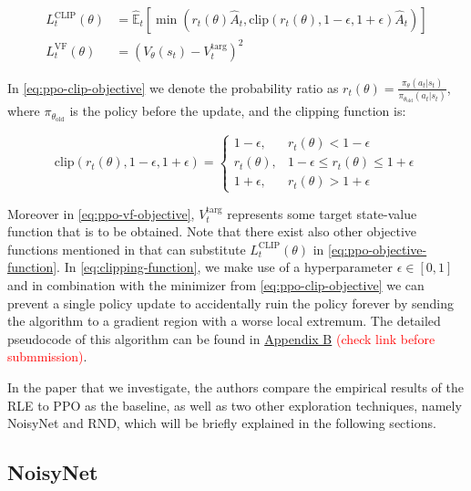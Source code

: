 \documentclass[10pt]{article} %
\begin{document}
\begin{align}
  \label{eq:ppo-clip-objective} L_{t}^{\text{CLIP}}(\theta) &= \hat{\mathbb{E}}_{t}\left[\min\left(r_{t}(\theta) \hat{A}_{t}, \text{clip}\left(r_{t}(\theta), 1 - \epsilon, 1 + \epsilon\right) \hat{A}_{t}\right)\right]\\
  \label{eq:ppo-vf-objective} L_{t}^{\text{VF}}(\theta) &= \left(V_{\theta}(s_{t}) - V_{t}^{\text{targ}}\right)^{2}
\end{align}

\noindent In \eqref{eq:ppo-clip-objective} we denote the probability ratio as $r_{t}(\theta) = \frac{\pi_{\theta}\left(a_{t}|s_{t}\right)}{\pi_{\theta_{\text{old}}}(a_{t}|s_{t})}$, where $\pi_{\theta_{\text{old}}}$ is the policy before the update, and the clipping function is:

\begin{equation}
  \text{clip}\left(r_{t}(\theta), 1 - \epsilon, 1 + \epsilon\right) = \begin{cases}
    1 - \epsilon, &r_{t}(\theta) < 1 - \epsilon\\
    r_{t}(\theta), &1 - \epsilon \leq r_{t}(\theta) \leq 1 + \epsilon\\
    1 + \epsilon, &r_{t}(\theta) > 1 + \epsilon
  \end{cases}
  \label{eq:clipping-function}
\end{equation}

\noindent Moreover in \eqref{eq:ppo-vf-objective}, $V_{t}^{\text{targ}}$ represents some target state-value function that is to be obtained. Note that there exist also other objective functions mentioned in \cite{ppo-paper} that can substitute $L_{t}^{\text{CLIP}}(\theta)$ in \eqref{eq:ppo-objective-function}. In \eqref{eq:clipping-function}, we make use of a hyperparameter $\epsilon \in [0, 1]$ and in combination with the minimizer from \eqref{eq:ppo-clip-objective} we can prevent a single policy update to accidentally ruin the policy forever by sending the algorithm to a gradient region with a worse local extremum. The detailed pseudocode of this algorithm can be found in \hyperlink{algo-ppo}{Appendix B} \textcolor{red}{(check link before submmission)}.

\noindent In the paper that we investigate, the authors \cite{rle-paper} compare the empirical results of the RLE to PPO as the baseline, as well as two other exploration techniques, namely NoisyNet and RND, which will be briefly explained in the following sections.

\subsection{NoisyNet}
\end{document}
